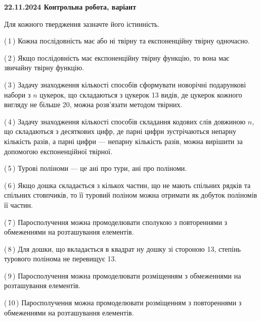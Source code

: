 \documentclass[12pt, ukrainian]{article}
\begin{document}
\begin {large}
\begin {large}
\begin {large}
\begin {large}
\textbf{22.11.2024 Контрольна робота, варіант  }\par


{
Для кожного твердження зазначте його істинність.\par

\vspace{2mm}

(\,1\,) Кожна послідовність має або ні твірну та експоненційну твірну одночасно.%



(\,2\,) Якщо послідовність має експоненційну твірну функцію, то вона має звичайну твірну функцію.%



(\,3\,) Задачу знаходження кількості способів сформувати новорічні подарункові набори з $n$ цукерок, що складаються з цукерок 13 видів, де цукерок кожного вигляду не більше 20, можна розв’язати методом твірних.%



(\,4\,) Задачу знаходження кількості способів складання кодових слів довжиною $n$, що складаються з десяткових цифр, де парні цифри зустрічаються непарну кількість разів, а парні цифри — непарну кількість разів, можна вирішити за допомогою експоненційної твірної.%



(\,5\,) Турові поліноми --- це ані про тури, ані про поліноми.%



(\,6\,) Якщо дошка складається з кількох частин, що не мають спільних рядків та спільних стовпчиків, то її туровий поліном можна отримати як добуток поліномів її частин.%



(\,7\,) Паросполучення можна промоделювати сполукою з повтореннями з обмеженнями на розташування елементів.%



(\,8\,) Для дошки, що вкладається в квадрат ну дошку зі стороною 13, степінь турового полінома не перевищує 13.%



(\,9\,) Паросполучення можна промоделювати розміщенням з обмеженнями на розташування елементів.%



(\,10\,) Паросполучення можна промоделювати розміщенням з повтореннями з обмеженнями на розташування елементів.%




\vspace{5mm}
}
\newpage


\end{large}
\end{large}
\end{large}
\end{large}
\end{document}
